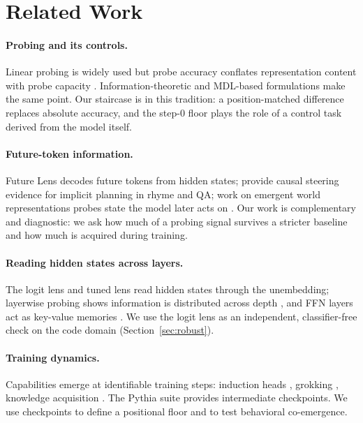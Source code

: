 \documentclass[11pt]{article}
\begin{document}
\section{Related Work}
\label{sec:related}

\paragraph{Probing and its controls.} Linear probing
\citep{alain2017,conneau2018} is widely used but probe accuracy conflates
representation content with probe capacity \citep{hewitt2019}.
Information-theoretic and MDL-based formulations \citep{voita2020,pimentel2020}
make the same point. Our staircase is in this tradition: a position-matched
difference replaces absolute accuracy, and the step-0 floor plays the role of a
control task derived from the model itself.

\paragraph{Future-token information.} Future Lens \citep{pal2023} decodes future
tokens from hidden states; \citet{maar2026} provide causal steering evidence for
implicit planning in rhyme and QA; work on emergent world representations probes
state the model later acts on \citep{li2023,gurnee2024}. Our work is
complementary and diagnostic: we ask how much of a probing signal survives a
stricter baseline and how much is acquired during training.

\paragraph{Reading hidden states across layers.} The logit lens
\citep{nostalgebraist2020} and tuned lens \citep{belrose2023} read hidden states
through the unembedding; layerwise probing shows information is distributed
across depth \citep{tenney2019}, and FFN layers act as key-value memories
\citep{geva2021}. We use the logit lens as an independent, classifier-free check
on the code domain (Section~\ref{sec:robust}).

\paragraph{Training dynamics.} Capabilities emerge at identifiable training
steps: induction heads \citep{olsson2022}, grokking \citep{nanda2023}, knowledge
acquisition \citep{mcgrath2022}. The Pythia suite \citep{biderman2023} provides
intermediate checkpoints. We use checkpoints to define a positional floor and to
test behavioral co-emergence.
\end{document}

